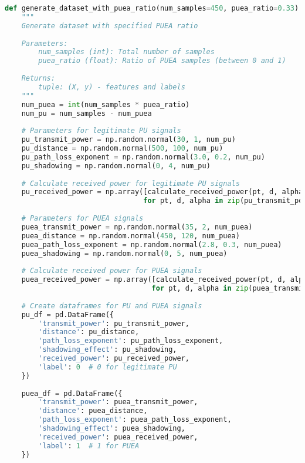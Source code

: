 \begin{lstlisting}[language=Python, caption=PUEA Percentage Experiment Implementation]
def generate_dataset_with_puea_ratio(num_samples=450, puea_ratio=0.33):
    """
    Generate dataset with specified PUEA ratio
    
    Parameters:
        num_samples (int): Total number of samples
        puea_ratio (float): Ratio of PUEA samples (between 0 and 1)
    
    Returns:
        tuple: (X, y) - features and labels
    """
    num_puea = int(num_samples * puea_ratio)
    num_pu = num_samples - num_puea
    
    # Parameters for legitimate PU signals
    pu_transmit_power = np.random.normal(30, 1, num_pu)
    pu_distance = np.random.normal(500, 100, num_pu)
    pu_path_loss_exponent = np.random.normal(3.0, 0.2, num_pu)
    pu_shadowing = np.random.normal(0, 4, num_pu)
    
    # Calculate received power for legitimate PU signals
    pu_received_power = np.array([calculate_received_power(pt, d, alpha, 4) 
                                 for pt, d, alpha in zip(pu_transmit_power, pu_distance, pu_path_loss_exponent)])
    
    # Parameters for PUEA signals
    puea_transmit_power = np.random.normal(35, 2, num_puea)
    puea_distance = np.random.normal(450, 120, num_puea)
    puea_path_loss_exponent = np.random.normal(2.8, 0.3, num_puea)
    puea_shadowing = np.random.normal(0, 5, num_puea)
    
    # Calculate received power for PUEA signals
    puea_received_power = np.array([calculate_received_power(pt, d, alpha, 5) 
                                   for pt, d, alpha in zip(puea_transmit_power, puea_distance, puea_path_loss_exponent)])
    
    # Create dataframes for PU and PUEA signals
    pu_df = pd.DataFrame({
        'transmit_power': pu_transmit_power,
        'distance': pu_distance,
        'path_loss_exponent': pu_path_loss_exponent,
        'shadowing_effect': pu_shadowing,
        'received_power': pu_received_power,
        'label': 0  # 0 for legitimate PU
    })
    
    puea_df = pd.DataFrame({
        'transmit_power': puea_transmit_power,
        'distance': puea_distance,
        'path_loss_exponent': puea_path_loss_exponent,
        'shadowing_effect': puea_shadowing,
        'received_power': puea_received_power,
        'label': 1  # 1 for PUEA
    })
    

\end{lstlisting}
